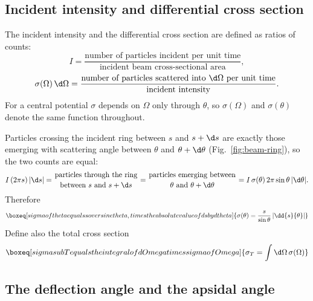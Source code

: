 \documentclass[11pt]{article}
\newcommand{\Om}{\Omega}
\begin{document}
\subsection{Incident intensity and differential cross section}

The incident intensity and the differential cross section are defined as
ratios of counts:
%
\begin{equation}\label{eq:intensity}
  I = \frac{\text{number of particles incident per unit time}}
           {\text{incident beam cross-sectional area}},
\end{equation}
%
\begin{equation}\label{eq:dcs-def}
  \sigma(\Om)\,\d\Om
    = \frac{\text{number of particles scattered into } \d\Om \text{ per unit time}}
           {\text{incident intensity}} .
\end{equation}
%
For a central potential $\sigma$ depends on $\Om$ only through $\theta$, so
$\sigma(\Om)$ and $\sigma(\theta)$ denote the same function throughout.

Particles crossing the incident ring between $s$ and $s+\d s$ are exactly those
emerging with scattering angle between $\theta$ and $\theta+\d\theta$
(Fig.~\ref{fig:beam-ring}), so the two counts are equal:
%
\begin{equation}\label{eq:count-match}
  I\,(2\pi s)\,\lvert \d s\rvert
    = \genfrac{}{}{0pt}{}{\text{particles through the ring}}{\text{between } s \text{ and } s+\d s}
    = \genfrac{}{}{0pt}{}{\text{particles emerging between}}{\theta \text{ and } \theta+\d\theta}
    = I\,\sigma(\theta)\,2\pi \sin\theta\,\lvert \d\theta\rvert .
\end{equation}
%
Therefore
%
\begin{equation}\label{eq:sigma-general}
  \boxeq[sigma of theta equals s over sine theta, times the absolute value of
  d s by d theta]{%
    \sigma(\theta) = \frac{s}{\sin\theta}\left\lvert \dd{s}{\theta} \right\rvert }
\end{equation}
%
Define also the total cross section
%
\begin{equation}\label{eq:sigma-T-def}
  \boxeq[sigma sub T equals the integral of d Omega times sigma of Omega]{%
    \sigma_T = \int \d\Om\,\sigma(\Om) }
\end{equation}

\subsection{The deflection angle and the apsidal angle}
\end{document}
